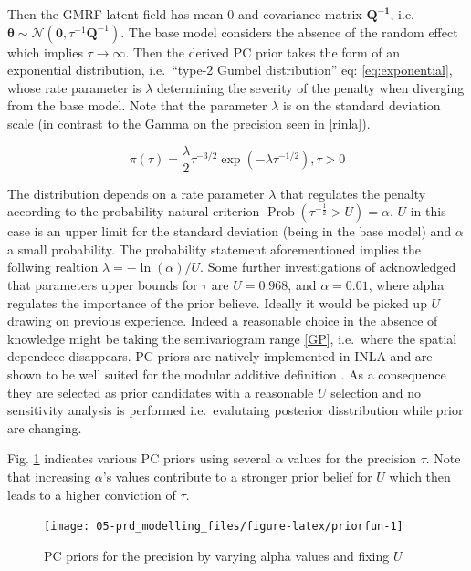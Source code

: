 \documentclass[
  12pt,
  a4paper,
  oneside]{book}
\theoremstyle{definition}
\theoremstyle{definition}
\theoremstyle{definition}
\theoremstyle{remark}
\begin{document}
Then the GMRF latent field has mean 0 and covariance matrix \(\boldsymbol{Q^{-1}}\), i.e.~\(\boldsymbol{\theta} \sim \mathcal{N}\left(\mathbf{0}, \tau^{-1} \boldsymbol{Q}^{-1}\right)\). The base model considers the absence of the random effect which implies \(\tau \rightarrow \infty\). Then the derived PC prior \citep{simpson2017} takes the form of an exponential distribution, i.e.~``type-2 Gumbel distribution'' eq: \eqref{eq:exponential}, whose rate parameter is \(\lambda\) determining the severity of the penalty when diverging from the base model. Note that the parameter \(\lambda\) is on the standard deviation scale (in contrast to the Gamma on the precision seen in \ref{rinla}).

\begin{equation}
  \pi(\tau)=\frac{\lambda}{2} \tau^{-3 / 2} \exp \left(-\lambda \tau^{-1 / 2}\right), \tau>0
\label{eq:exponential}
\end{equation}

The distribution depends on a rate parameter \(\lambda\) that regulates the penalty according to the probability natural criterion \citep{slides} \(\operatorname{Prob}(\tau^{-\frac{1}{2}} > U)=\alpha\). \(U\) in this case is an upper limit for the standard deviation (being in the base model) and \(\alpha\) a small probability. The probability statement aforementioned implies the follwing realtion \(\lambda=-\ln (\alpha) / U\). Some further investigations of \citet{simpson2017} acknowledged that parameters upper bounds for \(\tau\) are \(U = 0.968\), and \(\alpha = 0.01\), where alpha regulates the importance of the prior believe. Ideally it would be picked up \(U\) drawing on previous experience. Indeed a reasonable choice in the absence of knowledge might be taking the semivariogram range \ref{GP}, i.e.~where the spatial dependece disappears.
PC priors are natively implemented in INLA and are shown to be well suited for the modular additive definition \citep{Bayesian_INLA_Rubio}. As a consequence they are selected as prior candidates with a reasonable \(U\) selection and no sensitivity analysis is performed i.e.~evalutaing posterior disstribution while prior are changing.

Fig. \ref{fig:priorfun} indicates various PC priors using several \(\alpha\) values for the precision \(\tau\). Note that increasing \(\alpha\)'s values contribute to a stronger prior belief for \(U\) which then leads to a higher conviction of \(\tau\).

\begin{figure}

{\centering \texttt{[image: 05-prd\_modelling\_files/figure-latex/priorfun-1]} 

}

\caption{PC priors for the precision by varying alpha values and fixing $U$}\label{fig:priorfun}
\end{figure}
\end{document}
